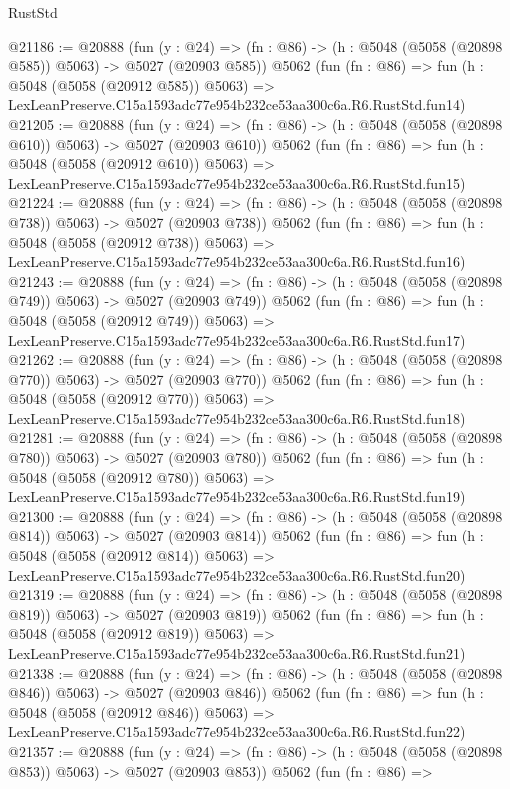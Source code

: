 \begin{lexlean}{RustStd}
\begin{coremodule}
@21186 := @20888
    (fun (y : @24) => (fn : @86) -> (h : @5048 (@5058 (@20898 @585)) @5063) -> @5027 (@20903 @585))
    @5062
    (fun (fn : @86) =>
    fun (h : @5048 (@5058 (@20912 @585)) @5063) =>
    LexLeanPreserve.C15a1593adc77e954b232ce53aa300c6a.R6.RustStd.fun14)
@21205 := @20888
    (fun (y : @24) => (fn : @86) -> (h : @5048 (@5058 (@20898 @610)) @5063) -> @5027 (@20903 @610))
    @5062
    (fun (fn : @86) =>
    fun (h : @5048 (@5058 (@20912 @610)) @5063) =>
    LexLeanPreserve.C15a1593adc77e954b232ce53aa300c6a.R6.RustStd.fun15)
@21224 := @20888
    (fun (y : @24) => (fn : @86) -> (h : @5048 (@5058 (@20898 @738)) @5063) -> @5027 (@20903 @738))
    @5062
    (fun (fn : @86) =>
    fun (h : @5048 (@5058 (@20912 @738)) @5063) =>
    LexLeanPreserve.C15a1593adc77e954b232ce53aa300c6a.R6.RustStd.fun16)
@21243 := @20888
    (fun (y : @24) => (fn : @86) -> (h : @5048 (@5058 (@20898 @749)) @5063) -> @5027 (@20903 @749))
    @5062
    (fun (fn : @86) =>
    fun (h : @5048 (@5058 (@20912 @749)) @5063) =>
    LexLeanPreserve.C15a1593adc77e954b232ce53aa300c6a.R6.RustStd.fun17)
@21262 := @20888
    (fun (y : @24) => (fn : @86) -> (h : @5048 (@5058 (@20898 @770)) @5063) -> @5027 (@20903 @770))
    @5062
    (fun (fn : @86) =>
    fun (h : @5048 (@5058 (@20912 @770)) @5063) =>
    LexLeanPreserve.C15a1593adc77e954b232ce53aa300c6a.R6.RustStd.fun18)
@21281 := @20888
    (fun (y : @24) => (fn : @86) -> (h : @5048 (@5058 (@20898 @780)) @5063) -> @5027 (@20903 @780))
    @5062
    (fun (fn : @86) =>
    fun (h : @5048 (@5058 (@20912 @780)) @5063) =>
    LexLeanPreserve.C15a1593adc77e954b232ce53aa300c6a.R6.RustStd.fun19)
@21300 := @20888
    (fun (y : @24) => (fn : @86) -> (h : @5048 (@5058 (@20898 @814)) @5063) -> @5027 (@20903 @814))
    @5062
    (fun (fn : @86) =>
    fun (h : @5048 (@5058 (@20912 @814)) @5063) =>
    LexLeanPreserve.C15a1593adc77e954b232ce53aa300c6a.R6.RustStd.fun20)
@21319 := @20888
    (fun (y : @24) => (fn : @86) -> (h : @5048 (@5058 (@20898 @819)) @5063) -> @5027 (@20903 @819))
    @5062
    (fun (fn : @86) =>
    fun (h : @5048 (@5058 (@20912 @819)) @5063) =>
    LexLeanPreserve.C15a1593adc77e954b232ce53aa300c6a.R6.RustStd.fun21)
@21338 := @20888
    (fun (y : @24) => (fn : @86) -> (h : @5048 (@5058 (@20898 @846)) @5063) -> @5027 (@20903 @846))
    @5062
    (fun (fn : @86) =>
    fun (h : @5048 (@5058 (@20912 @846)) @5063) =>
    LexLeanPreserve.C15a1593adc77e954b232ce53aa300c6a.R6.RustStd.fun22)
@21357 := @20888
    (fun (y : @24) => (fn : @86) -> (h : @5048 (@5058 (@20898 @853)) @5063) -> @5027 (@20903 @853))
    @5062
    (fun (fn : @86) =>

\end{coremodule}
\end{lexlean}
